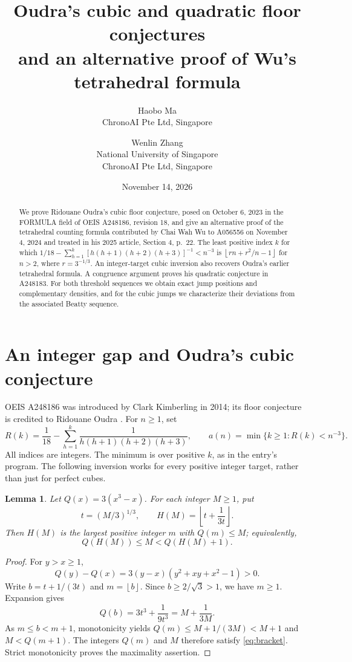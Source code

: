 \documentclass[11pt]{article}
\title{Oudra's cubic and quadratic floor conjectures\\
and an alternative proof of Wu's tetrahedral formula}
\author{Haobo Ma\\\small ChronoAI Pte Ltd, Singapore
\and Wenlin Zhang\\\small National University of Singapore\\\small ChronoAI Pte Ltd, Singapore}
\date{November 14, 2026}
\newtheorem{lemma}[theorem]{Lemma}
\newcommand{\floor}[1]{\left\lfloor #1\right\rfloor}
\begin{document}
\maketitle
\begin{abstract}
We prove Ridouane Oudra's cubic floor conjecture, posed on October 6,
2023 in the FORMULA field of OEIS A248186, revision 18, and give an
alternative proof of the tetrahedral counting formula contributed by
Chai Wah Wu to A056556 on November 4, 2024 and treated in his 2025
article, Section 4, p.~22. The least positive index $k$ for which
$1/18-\sum_{h=1}^k[h(h+1)(h+2)(h+3)]^{-1}<n^{-3}$ is
$\floor{rn+r^2/n-1}$ for $n>2$, where $r=3^{-1/3}$.
An integer-target cubic inversion also recovers Oudra's earlier
tetrahedral formula. A congruence argument proves his quadratic
conjecture in A248183. For both threshold sequences we obtain exact
jump positions and complementary densities, and for the cubic jumps
we characterize their deviations from the associated Beatty sequence.
\end{abstract}

\section{An integer gap and Oudra's cubic conjecture}
OEIS A248186 was introduced by Clark Kimberling in 2014; its floor
conjecture is credited to Ridouane Oudra \cite{cubic}. For $n\geq1$, set
\[
 R(k)=\frac1{18}-\sum_{h=1}^k\frac1{h(h+1)(h+2)(h+3)},\qquad
 a(n)=\min\{k\geq1:R(k)<n^{-3}\}.
\]
All indices are integers. The minimum is over positive $k$, as in the
entry's program. The following inversion works for every positive
integer target, rather than just for perfect cubes.

\begin{lemma}\label{lem:integer}
Let $Q(x)=3(x^3-x)$. For each integer $M\geq1$, put
\[
 t=(M/3)^{1/3},\qquad H(M)=\floor{t+\frac1{3t}}.
\]
Then $H(M)$ is the largest positive integer $m$ with $Q(m)\leq M$;
equivalently,
\begin{equation}\label{eq:bracket}
 Q(H(M))\leq M<Q(H(M)+1).
\end{equation}
\end{lemma}
\begin{proof}
For $y>x\geq1$,
\[
 Q(y)-Q(x)=3(y-x)(y^2+xy+x^2-1)>0.
\]
Write $b=t+1/(3t)$ and $m=\floor b$. Since
$b\geq2/\sqrt3>1$, we have $m\geq1$. Expansion gives
\begin{equation}\label{eq:overshoot}
 Q(b)=3t^3+\frac1{9t^3}=M+\frac1{3M}.
\end{equation}
As $m\leq b<m+1$, monotonicity yields
$Q(m)\leq M+1/(3M)<M+1$ and $M<Q(m+1)$.
The integers $Q(m)$ and $M$ therefore satisfy \eqref{eq:bracket}.
Strict monotonicity proves the maximality assertion.
\end{proof}
\end{document}
